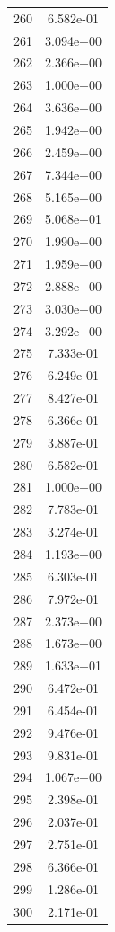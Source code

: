 \documentclass[12pt]{article}
\begin{document}
\begin{longtable}{@{}cc@{}}
260 & 6.582e-01 \\
261 & 3.094e+00 \\
262 & 2.366e+00 \\
263 & 1.000e+00 \\
264 & 3.636e+00 \\
265 & 1.942e+00 \\
266 & 2.459e+00 \\
267 & 7.344e+00 \\
268 & 5.165e+00 \\
269 & 5.068e+01 \\
270 & 1.990e+00 \\
271 & 1.959e+00 \\
272 & 2.888e+00 \\
273 & 3.030e+00 \\
274 & 3.292e+00 \\
275 & 7.333e-01 \\
276 & 6.249e-01 \\
277 & 8.427e-01 \\
278 & 6.366e-01 \\
279 & 3.887e-01 \\
280 & 6.582e-01 \\
281 & 1.000e+00 \\
282 & 7.783e-01 \\
283 & 3.274e-01 \\
284 & 1.193e+00 \\
285 & 6.303e-01 \\
286 & 7.972e-01 \\
287 & 2.373e+00 \\
288 & 1.673e+00 \\
289 & 1.633e+01 \\
290 & 6.472e-01 \\
291 & 6.454e-01 \\
292 & 9.476e-01 \\
293 & 9.831e-01 \\
294 & 1.067e+00 \\
295 & 2.398e-01 \\
296 & 2.037e-01 \\
297 & 2.751e-01 \\
298 & 6.366e-01 \\
299 & 1.286e-01 \\
300 & 2.171e-01 \\

\bottomrule
\end{longtable}
\end{document}

